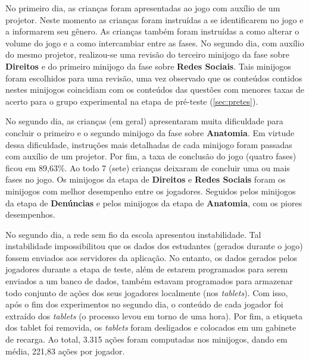 No primeiro dia, as crianças foram apresentadas ao jogo com auxílio de um projetor. Neste momento as crianças foram instruídas a se identificarem no jogo e a informarem seu gênero. As crianças também foram instruídas a como alterar o volume do jogo e a como intercambiar entre as fases. No segundo dia, com auxílio do mesmo projetor, realizou-se uma revisão do terceiro minijogo da fase sobre \textbf{Direitos} e do primeiro minijogo da fase sobre \textbf{Redes Sociais}. Tais minijogos foram escolhidos para uma revisão, uma vez observado que os conteúdos contidos nestes minijogos coincidiam com os conteúdos das questões com menores taxas de acerto para o grupo experimental na etapa de pré-teste (\autoref{sec:pretes}).

No segundo dia, as crianças (em geral) apresentaram muita dificuldade para concluir o primeiro e o segundo minijogo da fase sobre \textbf{Anatomia}. Em virtude dessa dificuldade, instruções mais detalhadas de cada minijogo foram passadas com auxílio de um projetor. Por fim, a taxa de conclusão do jogo (quatro fases) ficou em 89,63\%. Ao todo 7 (sete) crianças deixaram de concluir uma ou mais fases no jogo. Os minijogos da etapa de \textbf{Direitos} e \textbf{Redes Sociais} foram os minijogos com melhor desempenho entre os jogadores. Seguidos pelos minijogos da etapa de \textbf{Denúncias} e pelos minijogos da etapa de \textbf{Anatomia}, com os piores desempenhos. 

No segundo dia, a rede sem fio da escola apresentou instabilidade. Tal instabilidade impossibilitou que os dados dos estudantes (gerados durante o jogo) fossem enviados aos servidores da aplicação. No entanto, os dados gerados pelos jogadores durante a etapa de teste, além de estarem programados para serem enviados a um banco de dados, também estavam programados para armazenar todo conjunto de ações dos seus jogadores localmente (nos \textit{tablets}). Com isso, após o fim dos experimentos no segundo dia, o conteúdo de cada jogador foi extraído dos \textit{tablets} (o processo levou em torno de uma hora). Por fim, a etiqueta dos tablet foi removida, os \textit{tablets} foram desligados e colocados em um gabinete de recarga. Ao total, 3.315 ações foram computadas nos minijogos, dando em média, 221,83 ações por jogador.


